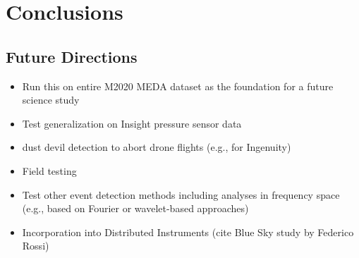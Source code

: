 \section{Conclusions}

\subsection{Future Directions}
\begin{itemize}
    \item Run this on entire M2020 MEDA dataset as the foundation for a future science study
    \item Test generalization on Insight pressure sensor data
    \item dust devil detection to abort drone flights (e.g., for Ingenuity)
    \item Field testing
    \item Test other event detection methods including analyses in frequency space (e.g., based on Fourier or wavelet-based approaches)
    \item Incorporation into Distributed Instruments (cite Blue Sky study by Federico Rossi)
\end{itemize}